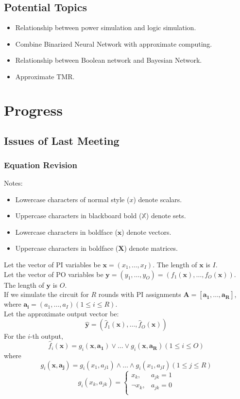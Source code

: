 \documentclass{rpt}
\begin{document}
\subsection{Potential Topics}
\begin{itemize}
    \item Relationship between power simulation and logic simulation.
    \item Combine Binarized Neural Network with approximate computing.
    \item Relationship between Boolean network and Bayesian Network.
    \item Approximate TMR\@.
\end{itemize}

\section{Progress}

\subsection{Issues of Last Meeting}
\subsubsection{Equation Revision}
Notes:
\begin{itemize}
    \item Lowercase characters of normal style ($x$) denote scalars.
    \item Uppercase characters in blackboard bold ($\mathbb{X}$) denote sets.
    \item Lowercase characters in boldface ($\mathbf{x}$) denote vectors.
    \item Uppercase characters in boldface ($\mathbf{X}$) denote matrices.
\end{itemize}

Let the vector of PI variables be $\mathbf{x} = (x_1, \ldots, x_I)$.
The length of $\mathbf{x}$ is $I$. \\
Let the vector of PO variables be $\mathbf{y} = (y_1, \ldots, y_O) = (f_1(\mathbf{x}), \ldots, f_O(\mathbf{x}))$.
The length of $\mathbf{y}$ is $O$. \\
If we simulate the circuit for $R$ rounds with PI assignments $\mathbf{A} = [\mathbf{a_1}, \ldots, \mathbf{a_R}]$,
where $\mathbf{a_i} = (a_1, \ldots, a_I)(1\leq i\leq R)$. \\
Let the approximate output vector be:
\[
    \mathbf{\hat{y}} = (\hat{f}_1(\mathbf{x}), \ldots, \hat{f}_O(\mathbf{x}))
\]
For the $i$-th output,
\[
    \hat{f}_i(\mathbf{x}) = g_i(\mathbf{x}, \mathbf{a_1}) \lor \ldots \lor g_i(\mathbf{x}, \mathbf{a_R}) (1\leq i \leq O)
\]
where
\[
    g_i(\mathbf{x}, \mathbf{a_j}) = g_i(x_1, a_{j1})\land \ldots \land g_i(x_1, a_{jI}) (1\leq j \leq R)
\]
\[
    g_i(x_k, a_{jk}) = \left \{
        \begin{array}{ll}
            x_k, & a_{jk} = 1 \\
            \neg x_k, & a_{jk} = 0 \\
        \end{array}
    \right.
\]
\end{document}

